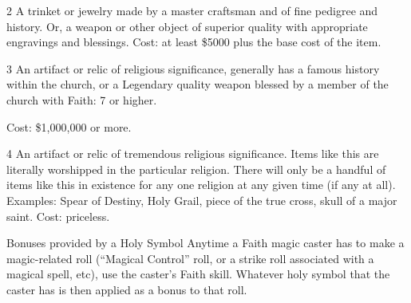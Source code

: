 \documentclass[twoside]{book}
\begin{document}
                  
                   2   
                     A trinket or jewelry made by a master
                     craftsman and of fine pedigree and history. Or, a
                     weapon or other object of superior quality with
                     appropriate engravings and blessings. 
                     Cost: at least \$5000 plus the base cost of the
                     item. 
                  
                  
                   3   
                     An artifact or relic of religious
                     significance, generally has a famous history within
                     the church, or a Legendary quality weapon blessed by
                     a member of the church with Faith: 7 or higher.
                     
                   Cost: \$1,000,000 or more.   
                  
                  
                   4   
                     An artifact or relic of tremendous religious
                     significance. Items like this are literally
                     worshipped in the particular religion. There will
                     only be a handful of items like this in existence
                     for any one religion at any given time (if any at
                     all). Examples: Spear of Destiny, Holy Grail, piece
                     of the true cross, skull of a major saint. 
                   Cost: priceless.   
                  
                
              Bonuses provided by a Holy Symbol  
              Anytime a Faith magic caster has to make a
               magic-related roll (“Magical Control” roll, or
               a strike roll associated with a magical spell, etc), use
               the caster’s Faith skill. Whatever holy symbol that
               the caster has is then applied as a bonus to that roll.
               
\end{document}
